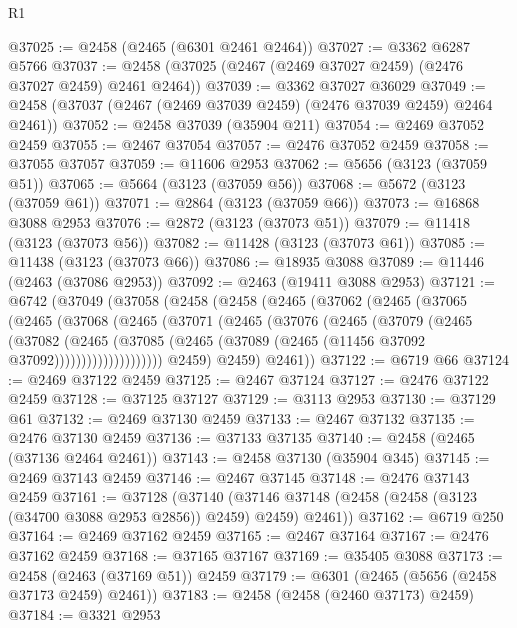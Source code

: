 \begin{lexlean}{R1}
\begin{coremodule}
@37025 := @2458 (@2465 (@6301 @2461 @2464))
@37027 := @3362 @6287 @5766
@37037 := @2458 (@37025 (@2467 (@2469 @37027 @2459) (@2476 @37027 @2459) @2461 @2464))
@37039 := @3362 @37027 @36029
@37049 := @2458 (@37037 (@2467 (@2469 @37039 @2459) (@2476 @37039 @2459) @2464 @2461))
@37052 := @2458 @37039 (@35904 @211)
@37054 := @2469 @37052 @2459
@37055 := @2467 @37054
@37057 := @2476 @37052 @2459
@37058 := @37055 @37057
@37059 := @11606 @2953
@37062 := @5656 (@3123 (@37059 @51))
@37065 := @5664 (@3123 (@37059 @56))
@37068 := @5672 (@3123 (@37059 @61))
@37071 := @2864 (@3123 (@37059 @66))
@37073 := @16868 @3088 @2953
@37076 := @2872 (@3123 (@37073 @51))
@37079 := @11418 (@3123 (@37073 @56))
@37082 := @11428 (@3123 (@37073 @61))
@37085 := @11438 (@3123 (@37073 @66))
@37086 := @18935 @3088
@37089 := @11446 (@2463 (@37086 @2953))
@37092 := @2463 (@19411 @3088 @2953)
@37121 := @6742
    (@37049
      (@37058
        (@2458
          (@2458
            (@2465
              (@37062
                (@2465
                  (@37065
                    (@2465
                      (@37068
                        (@2465
                          (@37071
                            (@2465
                              (@37076
                                (@2465
                                  (@37079
                                    (@2465
                                      (@37082
                                        (@2465
                                          (@37085
                                            (@2465
                                              (@37089
                                                (@2465 (@11456 @37092 @37092))))))))))))))))))))
            @2459)
          @2459)
        @2461))
@37122 := @6719 @66
@37124 := @2469 @37122 @2459
@37125 := @2467 @37124
@37127 := @2476 @37122 @2459
@37128 := @37125 @37127
@37129 := @3113 @2953
@37130 := @37129 @61
@37132 := @2469 @37130 @2459
@37133 := @2467 @37132
@37135 := @2476 @37130 @2459
@37136 := @37133 @37135
@37140 := @2458 (@2465 (@37136 @2464 @2461))
@37143 := @2458 @37130 (@35904 @345)
@37145 := @2469 @37143 @2459
@37146 := @2467 @37145
@37148 := @2476 @37143 @2459
@37161 := @37128
    (@37140 (@37146 @37148 (@2458 (@2458 (@3123 (@34700 @3088 @2953 @2856)) @2459) @2459) @2461))
@37162 := @6719 @250
@37164 := @2469 @37162 @2459
@37165 := @2467 @37164
@37167 := @2476 @37162 @2459
@37168 := @37165 @37167
@37169 := @35405 @3088
@37173 := @2458 (@2463 (@37169 @51)) @2459
@37179 := @6301 (@2465 (@5656 (@2458 @37173 @2459) @2461))
@37183 := @2458 (@2458 (@2460 @37173) @2459)
@37184 := @3321 @2953

\end{coremodule}
\end{lexlean}

